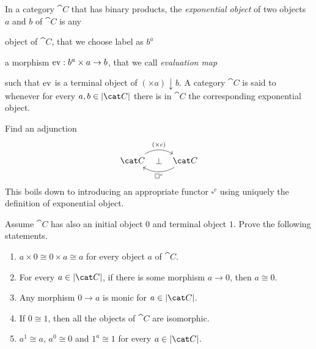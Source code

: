 \begin{exercise}\label{exercise:ExponentialObject}
  In a category \(\cat C\) that has binary products, the {\em
    exponential object} of two objects \(a\) and \(b\) of \(\cat C\)
  is any
  \begin{tcbitem}
  \item object of \(\cat C\), that we choose label as \(b^a\)
  \item a morphism \(\operatorname{ev} : b^a \times a \to b\), that we call {\em evaluation
      map}
  \end{tcbitem}
  such that \(\operatorname{ev}\) is a terminal object of
  \((\times a) \downarrow b\). A category \(\cat C\) is said to  whenever for every \(a, b \in \obj{\cat C}\) there is
  in \(\cat C\) the corresponding exponential object.

  \begin{tcbenum}
  \item Find an adjunction
    \[\begin{tikzcd}
        \cat C \ar["{(\times c)}"{name=L}, r, bend left] & \cat C
        \ar["{\square^c}"{name=R}, l, bend left] \ar["\perp"{description},
        phantom, from=L, to=R]
      \end{tikzcd}\] This boils down to introducing an appropriate
    functor \(\square^c\) using uniquely the definition of exponential
    object.
  \item Assume \(\cat C\) has also an initial object \(0\) and
    terminal object \(1\). Prove the following statements.
    \begin{enumerate}[leftmargin=*,label=(\roman*)]
    \item \(a \times 0 \cong 0 \times a \cong a\) for every object
      \(a\) of \(\cat C\).
    \item For every \(a \in \obj{\cat C}\), if there is some morphism
      \(a \to 0\), then \(a \cong 0\).
    \item Any morphism \(0 \to a\) is monic for
      \(a \in \obj{\cat C}\).
    \item If \(0 \cong 1\), then all the objects of \(\cat C\) are
      isomorphic.
    \item \(a^1 \cong a\), \(a^0 \cong 0\) and \(1^a \cong 1\) for
      every \(a \in \obj{\cat C}\).
    \end{enumerate}
  \end{tcbenum}
\end{exercise}

\begin{exercise}
  \YetToBeTeXed{} %
\end{exercise}

